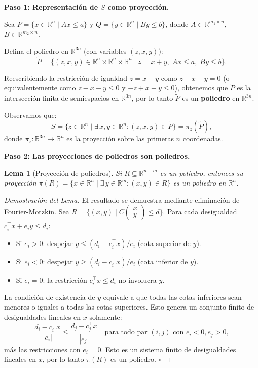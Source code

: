 \documentclass{article}
\newtheorem*{lema}{Lema}
\begin{document}
\medskip
\noindent\textbf{Paso 1: Representación de $S$ como proyección.}

Sea $P = \{x \in \mathbb{R}^n \mid Ax \leq a\}$ y $Q = \{y \in \mathbb{R}^n \mid By \leq b\}$, donde $A \in \mathbb{R}^{m_1 \times n}$, $B \in \mathbb{R}^{m_2 \times n}$.

Defina el poliedro en $\mathbb{R}^{3n}$ (con variables $(z, x, y)$):
\[
\tilde{P} = \{(z, x, y) \in \mathbb{R}^n \times \mathbb{R}^n \times \mathbb{R}^n \mid z = x + y,\; Ax \leq a,\; By \leq b\}.
\]

Reescribiendo la restricción de igualdad $z = x + y$ como $z - x - y = 0$ (o equivalentemente como $z - x - y \leq 0$ y $-z + x + y \leq 0$), obtenemos que $\tilde{P}$ es la intersección finita de semiespacios en $\mathbb{R}^{3n}$, por lo tanto $\tilde{P}$ es un \textbf{poliedro} en $\mathbb{R}^{3n}$.

Observamos que:
\[
S = \{z \in \mathbb{R}^n \mid \exists\, x, y \in \mathbb{R}^n : (z, x, y) \in \tilde{P}\} = \pi_z(\tilde{P}),
\]
donde $\pi_z : \mathbb{R}^{3n} \to \mathbb{R}^n$ es la proyección sobre las primeras $n$ coordenadas.

\medskip
\noindent\textbf{Paso 2: Las proyecciones de poliedros son poliedros.}

\begin{lema}[Proyección de poliedros]
Si $R \subseteq \mathbb{R}^{n+m}$ es un poliedro, entonces su proyección $\pi(R) = \{x \in \mathbb{R}^n \mid \exists\, y \in \mathbb{R}^m : (x, y) \in R\}$ es un poliedro en $\mathbb{R}^n$.
\end{lema}

\begin{proof}[Demostración del Lema]
El resultado se demuestra mediante eliminación de Fourier-Motzkin. Sea $R = \{(x,y) \mid C\begin{pmatrix}x\\y\end{pmatrix} \leq d\}$. Para cada desigualdad $c_i^\top x + e_i y \leq d_i$:
\begin{itemize}
\item Si $e_i > 0$: despejar $y \leq (d_i - c_i^\top x)/e_i$ (cota superior de $y$).
\item Si $e_i < 0$: despejar $y \geq (d_i - c_i^\top x)/e_i$ (cota inferior de $y$).
\item Si $e_i = 0$: la restricción $c_i^\top x \leq d_i$ no involucra $y$.
\end{itemize}
La condición de existencia de $y$ equivale a que todas las cotas inferiores sean menores o iguales a todas las cotas superiores. Esto genera un conjunto finito de desigualdades lineales en $x$ solamente:
\[
\frac{d_i - c_i^\top x}{|e_i|} \leq \frac{d_j - c_j^\top x}{|e_j|} \quad \text{para todo par } (i,j) \text{ con } e_i < 0, e_j > 0,
\]
más las restricciones con $e_i = 0$. Esto es un sistema finito de desigualdades lineales en $x$, por lo tanto $\pi(R)$ es un poliedro. $\square$
\end{proof}
\end{document}
